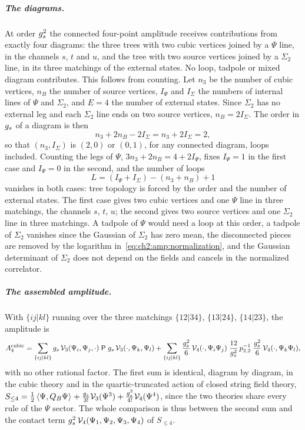 \subparagraph{The diagrams.}
At order $g_s^2$ the connected four-point amplitude receives contributions from exactly four diagrams: the three trees with two cubic vertices joined by a $\Psi$ line, in the channels $s$, $t$ and $u$, and the tree with two source vertices joined by a $\Sigma_2$ line, in its three matchings of the external states.
No loop, tadpole or mixed diagram contributes.
This follows from counting.
Let $n_3$ be the number of cubic vertices, $n_B$ the number of source vertices, $I_\Psi$ and $I_\Sigma$ the numbers of internal lines of $\Psi$ and $\Sigma_2$, and $E = 4$ the number of external states.
Since $\Sigma_2$ has no external leg and each $\Sigma_2$ line ends on two source vertices, $n_B = 2 I_\Sigma$.
The order in $g_s$ of a diagram is then
\begin{equation}
  n_3 + 2 n_B - 2 I_\Sigma
    = n_3 + 2 I_\Sigma
    = 2,
\end{equation}
so that $(n_3, I_\Sigma)$ is $(2, 0)$ or $(0, 1)$, for any connected diagram, loops included.
Counting the legs of $\Psi$, $3 n_3 + 2 n_B = 4 + 2 I_\Psi$, fixes $I_\Psi = 1$ in the first case and $I_\Psi = 0$ in the second, and the number of loops
\begin{equation}
  L
    = (I_\Psi + I_\Sigma) - (n_3 + n_B) + 1
\end{equation}
vanishes in both cases: tree topology is forced by the order and the number of external states.
The first case gives two cubic vertices and one $\Psi$ line in three matchings, the channels $s$, $t$, $u$; the second gives two source vertices and one $\Sigma_2$ line in three matchings.
A tadpole of $\Psi$ would need a loop at this order, a tadpole of $\Sigma_2$ vanishes since the Gaussian of $\Sigma_2$ has zero mean, the disconnected pieces are removed by the logarithm in~\eqref{eq:ch2:amp:normalization}, and the Gaussian determinant of $\Sigma_2$ does not depend on the fields and cancels in the normalized correlator.

\subparagraph{The assembled amplitude.}
With $\{ij | kl\}$ running over the three matchings $\{12 | 34\}$, $\{13 | 24\}$, $\{14 | 23\}$, the amplitude is
\begin{equation}
  \label{eq:ch2:amp:assembled}
  A_4^{\text{cubic}}
    = \sum_{\{ij | kl\}} g_s \, \mathcal{V}_{3}(\Psi_i, \Psi_j, \cdot) \; \mathsf P \; g_s \, \mathcal{V}_{3}(\cdot, \Psi_k, \Psi_l)
      + \sum_{\{ij | kl\}} \frac{g_s^2}{6} \, \mathcal{V}_{4}(\cdot, \Psi_i \Psi_j) \; \frac{12}{g_s^2} \, p_{2,2}^{-1} \; \frac{g_s^2}{6} \, \mathcal{V}_{4}(\cdot, \Psi_k \Psi_l),
\end{equation}
with no other rational factor.
The first sum is identical, diagram by diagram, in the cubic theory and in the quartic-truncated action of closed string field theory, $S_{\le 4} = \tfrac12 \braket{\Psi, Q_B \Psi}_{} + \tfrac{g_s}{3!} \mathcal{V}_{3}(\Psi^3) + \tfrac{g_s^2}{4!} \mathcal{V}_{4}(\Psi^4)$, since the two theories share every rule of the $\Psi$ sector.
The whole comparison is thus between the second sum and the contact term $g_s^2 \, \mathcal{V}_{4}(\Psi_1, \Psi_2, \Psi_3, \Psi_4)$ of $S_{\le 4}$.

